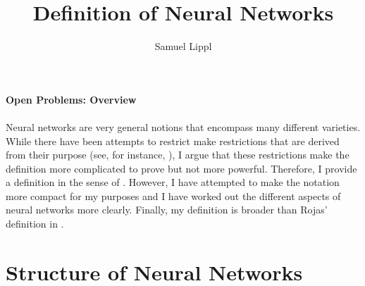 \documentclass[a4paper,11pt]{article}
\title{Definition of Neural Networks}
\author{Samuel Lippl}
\begin{document}
\renewcommand{\abstractname}{\vspace{-\baselineskip}}
\theoremstyle{change} %
\theoremheaderfont{\normalfont\scshape}
\theorembodyfont{\normalfont}
\newtheorem{Def}{Definition}[section]
\newtheorem{The}[Def]{Theorem}
\newtheorem{Lem}[Def]{Lemma}
\newtheorem{Pro}[Def]{Proposition}
\newtheorem{Kor}[Def]{Korollar}
\newtheorem{Bem}[Def]{Bemerkung}
\newtheorem{Not}[Def]{Notation}
\newtheorem{Bei}[Def]{Example}
\newtheorem{Ax}[Def]{Axiom}
\newtheorem{Con}[Def]{Condition}
\newtheorem{Hyp}[Def]{Hypothesis}
\newtheorem{OP}{Open Problem}
\theoremseparator{}
\newtheorem{Abs}[Def]{}
\theoremstyle{nonumberplain}
\theoremheaderfont{\normalfont\itshape}
\theoremsymbol{$\square$}
\newtheorem{Bew}{Proof}
\theoremstyle{change}
\theoremsymbol{}
\theoremheaderfont{\normalfont\scshape}
\newtheorem{BLem}[Def]{Lemma}
\theoremstyle{plain}
\theoremheaderfont{\normalfont\itshape}
\newtheorem{HLem}{Sublemma}[Def]
\newtheorem{BAbs}[HLem]{}
\theoremstyle{nonumberplain}
\theoremheaderfont{\normalfont\itshape}
\theoremsymbol{$\triangle$}
\newtheorem{BBew}{Proof}
\maketitle
\tableofcontents
\textbf{Open Problems: Overview}\\
\\
Neural networks are very general notions that encompass many different varieties. While there have been attempts to restrict make restrictions that are derived from their purpose (see, for instance, \cite{Guresen2011}), I argue that these restrictions make the definition more complicated to prove but not more powerful. Therefore, I provide a definition in the sense of \cite{Rojas1996}. However, I have attempted to make the notation more compact for my purposes and I have worked out the different aspects of neural networks more clearly. Finally, my definition is broader than Rojas' definition in \cite{Rojas1996}.
\section{Structure of Neural Networks}
\end{document}
